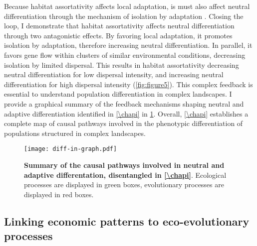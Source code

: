 Because habitat assortativity affects local adaptation, is must also affect neutral differentiation through the mechanism of isolation by adaptation \citep{Orsini2013}. Closing the loop, I demonstrate that habitat assortativity affects neutral differentiation through two antagonistic effects. By favoring local adaptation, it promotes isolation by adaptation, therefore increasing neutral differentiation. In parallel, it favors gene flow within clusters of similar environmental conditions, decreasing isolation by limited dispersal. This results in habitat assortativity decreasing neutral differentiation for low dispersal intensity, and increasing neutral differentiation for high dispersal intensity (\cref{fig:figure5}).
% 
This complex feedback is essential to understand population differentiation in complex landscapes.
% 
I provide a graphical summary of the feedback mechanisms shaping neutral and adaptive differentiation identified in \cref{\chapi} in \cref{fig:summary_diff-in-graph}. Overall, \cref{\chapi} establishes a complete map of causal pathways involved in the phenotypic differentiation of populations structured in complex landscapes. %

\begin{figure}[t]
    \centering
    \texttt{[image: diff-in-graph.pdf]}
    \caption{\textbf{Summary of the causal pathways involved in neutral and adaptive differentation, disentangled in \cref{\chapi}}. Ecological processes are displayed in green boxes, evolutionary processes are displayed in red boxes.}
    \label{fig:summary_diff-in-graph}
\end{figure}


\subsection{Linking economic patterns to eco-evolutionary processes}

